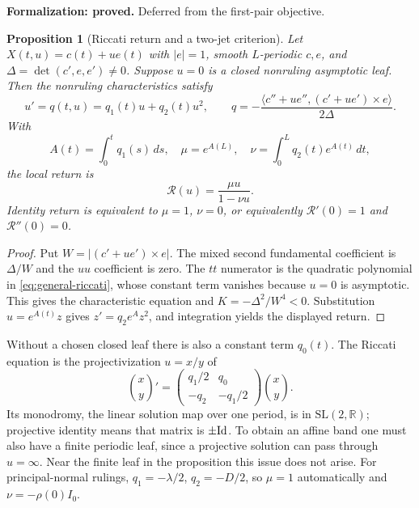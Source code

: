 \documentclass[11pt]{amsart}
\newtheorem{proposition}[theorem]{Proposition}
\theoremstyle{definition}
\theoremstyle{remark}
\newcommand{\R}{\mathbb R}\newcommand{\Sph}{\mathbb S}
\numberwithin{equation}{section}
\begin{document}
\par\noindent\textbf{Formalization: proved.} Deferred from the first-pair objective.\par
\begin{proposition}[Riccati return and a two-jet criterion]
\label{prop:general-ruled-return}
Let $X(t,u)=c(t)+ue(t)$ with $|e|=1$, smooth $L$-periodic $c,e$, and
$\Delta=\det(c',e,e')\ne0$. Suppose $u=0$ is a closed nonruling
asymptotic leaf. Then the nonruling characteristics satisfy
\begin{equation}\label{eq:general-riccati}
 u'=q(t,u)=q_1(t)u+q_2(t)u^2,
 \qquad q=-\frac{\langle c''+ue'',(c'+ue')\times e\rangle}{2\Delta}.
\end{equation}
With
\[
 A(t)=\int_0^tq_1(s)\,ds,\quad \mu=e^{A(L)},\quad
 \nu=\int_0^Lq_2(t)e^{A(t)}\,dt,
\]
the local return is
\begin{equation}\label{eq:general-return}
 \mathcal R(u)=\frac{\mu u}{1-\nu u}.
\end{equation}
Identity return is equivalent to $\mu=1$, $\nu=0$, or equivalently
$\mathcal R'(0)=1$ and $\mathcal R''(0)=0$.
\end{proposition}
\begin{proof}
Put $W=|(c'+ue')\times e|$. The mixed second fundamental coefficient
is $\Delta/W$ and the $uu$ coefficient is zero. The $tt$ numerator
is the quadratic polynomial in \eqref{eq:general-riccati}, whose constant
term vanishes because $u=0$ is asymptotic. This gives the characteristic
equation and $K=-\Delta^2/W^4<0$. Substitution $u=e^{A(t)}z$ gives
$z'=q_2e^Az^2$, and integration yields the displayed return.
\end{proof}
Without a chosen closed leaf there is also a constant term $q_0(t)$.
The Riccati equation is the projectivization $u=x/y$ of
\[
 \binom{x}{y}'=
 \begin{pmatrix}q_1/2&q_0\\-q_2&-q_1/2\end{pmatrix}\binom{x}{y}.
\]
Its monodromy, the linear solution map over one period, is in
$\mathrm{SL}(2,\R)$; projective identity means that
matrix is $\pm\mathrm{Id}$. To obtain an affine band one must also have a finite
periodic leaf, since a projective solution can pass through $u=\infty$.
Near the finite leaf in the proposition this issue does not arise.
For principal-normal rulings, $q_1=-\lambda/2$, $q_2=-D/2$, so
$\mu=1$ automatically and $\nu=-\rho(0)I_0$.
\end{document}
